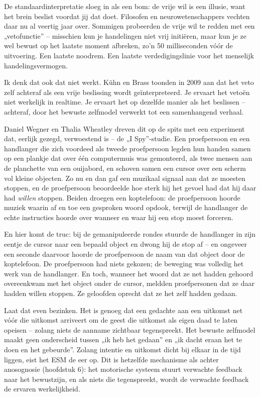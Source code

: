 \documentclass[11pt, twoside, openright]{book}
\begin{document}
De standaardinterpretatie sloeg in als een bom: de vrije wil is een illusie, want het brein beslist voordat jij dat doet. Filosofen en neurowetenschappers vechten daar nu al veertig jaar over. Sommigen probeerden de vrije wil te redden met een „vetofunctie” -- misschien kun je handelingen niet vrij initiëren, maar kun je ze wel bewust op het laatste moment afbreken, zo’n 50 milliseconden vóór de uitvoering. Een laatste noodrem. Een laatste verdedigingslinie voor het menselijk handelingsvermogen.

Ik denk dat ook dat niet werkt. Kühn en Brass toonden in 2009 aan dat het veto zelf achteraf als een vrije beslissing wordt geïnterpreteerd. Je ervaart het vetoën niet werkelijk in realtime. Je ervaart het op dezelfde manier als het beslissen -- achteraf, door het bewuste zelfmodel verwerkt tot een samenhangend verhaal.

Daniel Wegner en Thalia Wheatley dreven dit op de spits met een experiment dat, eerlijk gezegd, verwoestend is -- de „I Spy”-studie. Een proefpersoon en een handlanger die zich voordeed als tweede proefpersoon legden hun handen samen op een plankje dat over één computermuis was gemonteerd, als twee mensen aan de planchette van een ouijabord, en schoven samen een cursor over een scherm vol kleine objecten. Zo nu en dan gaf een muzikaal signaal aan dat ze moesten stoppen, en de proefpersoon beoordeelde hoe sterk hij het gevoel had dat hij daar had \textit{willen} stoppen. Beiden droegen een koptelefoon: de proefpersoon hoorde muziek waarin af en toe een gesproken woord opdook, terwijl de handlanger de echte instructies hoorde over wanneer en waar hij een stop moest forceren.

En hier komt de truc: bij de gemanipuleerde rondes stuurde de handlanger in zijn eentje de cursor naar een bepaald object en dwong hij de stop af -- en ongeveer een seconde daarvoor hoorde de proefpersoon de naam van dat object door de koptelefoon. De proefpersoon had niets gekozen; de beweging was volledig het werk van de handlanger. En toch, wanneer het woord dat ze net hadden gehoord overeenkwam met het object onder de cursor, meldden proefpersonen dat ze daar hadden willen stoppen. Ze geloofden oprecht dat ze het zelf hadden gedaan.

Laat dat even bezinken. Het is genoeg dat een gedachte aan een uitkomst net vóór die uitkomst arriveert om de geest die uitkomst als eigen daad te laten opeisen -- zolang niets de aanname zichtbaar tegenspreekt. Het bewuste zelfmodel maakt geen onderscheid tussen „ik heb het gedaan” en „ik dacht eraan het te doen en het gebeurde”. Zolang intentie en uitkomst dicht bij elkaar in de tijd liggen, eist het ESM de eer op. Dit is hetzelfde mechanisme als achter anosognosie (hoofdstuk 6): het motorische systeem stuurt verwachte feedback naar het bewustzijn, en als niets die tegenspreekt, wordt de verwachte feedback de ervaren werkelijkheid.
\end{document}
